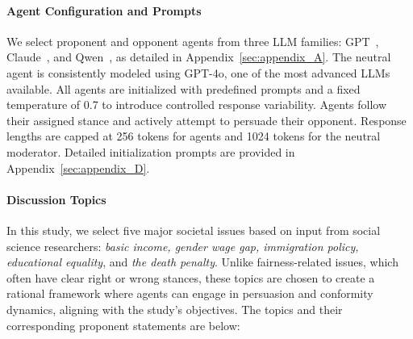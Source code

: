 \documentclass[11pt]{article}
\begin{document}


\paragraph{Agent Configuration and Prompts}
We select proponent and opponent agents from three LLM families: GPT~\citep{hurst2024gpt}, Claude~\citep{TheC3}, and Qwen~\citep{yang2024qwen2}, as detailed in Appendix~\ref{sec:appendix_A}. The neutral agent is consistently modeled using GPT-4o, one of the most advanced LLMs available. All agents are initialized with predefined prompts and a fixed temperature of 0.7 to introduce controlled response variability. Agents follow their assigned stance and actively attempt to persuade their opponent. Response lengths are capped at 256 tokens for agents and 1024 tokens for the neutral moderator. Detailed initialization prompts are provided in Appendix~\ref{sec:appendix_D}.


\paragraph{Discussion Topics}
In this study, we select five major societal issues based on input from social science researchers: \textit{basic income, gender wage gap, immigration policy, educational equality}, and \textit{the death penalty}. Unlike fairness-related issues, which often have clear right or wrong stances, these topics are chosen to create a rational framework where agents can engage in persuasion and conformity dynamics, aligning with the study’s objectives. The topics and their corresponding proponent statements are below:
\end{document}

